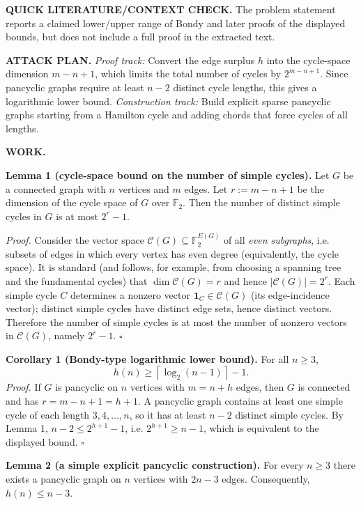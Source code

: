 \medskip
\noindent\textbf{QUICK LITERATURE/CONTEXT CHECK.}
The problem statement reports a claimed lower/upper range of Bondy and later proofs of the displayed bounds, but does not include a full proof in the extracted text.

\medskip
\noindent\textbf{ATTACK PLAN.}
\emph{Proof track:} Convert the edge surplus $h$ into the cycle-space dimension $m-n+1$, which limits the total number of cycles by $2^{m-n+1}$. Since pancyclic graphs require at least $n-2$ distinct cycle lengths, this gives a logarithmic lower bound.
\emph{Construction track:} Build explicit sparse pancyclic graphs starting from a Hamilton cycle and adding chords that force cycles of all lengths.

\medskip
\noindent\textbf{WORK.}

\noindent\textbf{Lemma 1 (cycle-space bound on the number of simple cycles).}
Let $G$ be a connected graph with $n$ vertices and $m$ edges. Let $r:=m-n+1$ be the dimension of the cycle space of $G$ over $\mathbb{F}_2$. Then the number of distinct simple cycles in $G$ is at most $2^r-1$.

\textit{Proof.}
Consider the vector space $\mathcal{C}(G)\subseteq \mathbb{F}_2^{E(G)}$ of all \emph{even subgraphs}, i.e. subsets of edges in which every vertex has even degree (equivalently, the cycle space).
It is standard (and follows, for example, from choosing a spanning tree and the fundamental cycles) that $\dim \mathcal{C}(G)=r$ and hence $|\mathcal{C}(G)|=2^r$.
Each simple cycle $C$ determines a nonzero vector $\mathbf{1}_C\in \mathcal{C}(G)$ (its edge-incidence vector); distinct simple cycles have distinct edge sets, hence distinct vectors.
Therefore the number of simple cycles is at most the number of nonzero vectors in $\mathcal{C}(G)$, namely $2^r-1$.
\hfill$\square$

\medskip
\noindent\textbf{Corollary 1 (Bondy-type logarithmic lower bound).}
For all $n\ge 3$,
\[
h(n)\ge \left\lceil \log_2(n-1)\right\rceil -1.
\]
\textit{Proof.}
If $G$ is pancyclic on $n$ vertices with $m=n+h$ edges, then $G$ is connected and has $r=m-n+1=h+1$.
A pancyclic graph contains at least one simple cycle of each length $3,4,\dots,n$, so it has at least $n-2$ distinct simple cycles.
By Lemma 1, $n-2\le 2^{h+1}-1$, i.e. $2^{h+1}\ge n-1$, which is equivalent to the displayed bound.
\hfill$\square$

\medskip
\noindent\textbf{Lemma 2 (a simple explicit pancyclic construction).}
For every $n\ge 3$ there exists a pancyclic graph on $n$ vertices with $2n-3$ edges. Consequently, $h(n)\le n-3$.

